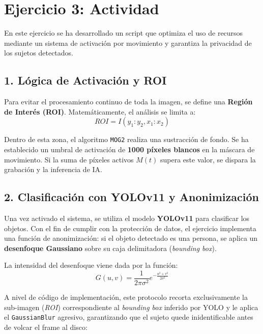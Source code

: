 \documentclass[12pt,a4paper]{article}
\begin{document}
\section{Ejercicio 3: Actividad}

En este ejercicio se ha desarrollado un script que optimiza el uso de recursos mediante un sistema de activación por movimiento y garantiza la privacidad de los sujetos detectados.

\subsection*{1. Lógica de Activación y ROI}
Para evitar el procesamiento continuo de toda la imagen, se define una \textbf{Región de Interés (ROI)}. Matemáticamente, el análisis se limita a:
\begin{equation}
    ROI = I(y_{1}:y_{2}, x_{1}:x_{2})
\end{equation}

Dentro de esta zona, el algoritmo \texttt{MOG2} realiza una sustracción de fondo. Se ha establecido un umbral de activación de \textbf{1000 píxeles blancos} en la máscara de movimiento. Si la suma de píxeles activos $M(t)$ supera este valor, se dispara la grabación y la inferencia de IA.

\subsection*{2. Clasificación con YOLOv11 y Anonimización}
Una vez activado el sistema, se utiliza el modelo \textbf{YOLOv11} para clasificar los objetos. Con el fin de cumplir con la protección de datos, el ejercicio implementa una función de anonimización: si el objeto detectado es una persona, se aplica un \textbf{desenfoque Gaussiano} sobre su caja delimitadora (\textit{bounding box}).

La intensidad del desenfoque viene dada por la función:
\begin{equation}
    G(u,v) = \frac{1}{2 \pi \sigma^2} e^{-\frac{u^2+v^2}{2\sigma^2}}
\end{equation}

A nivel de código de implementación, este protocolo recorta exclusivamente la sub-imagen (\textit{ROI}) correspondiente al \textit{bounding box} inferido por YOLO y le aplica el \texttt{GaussianBlur} agresivo, garantizando que el sujeto quede inidentificable antes de volcar el frame al disco:
\end{document}
